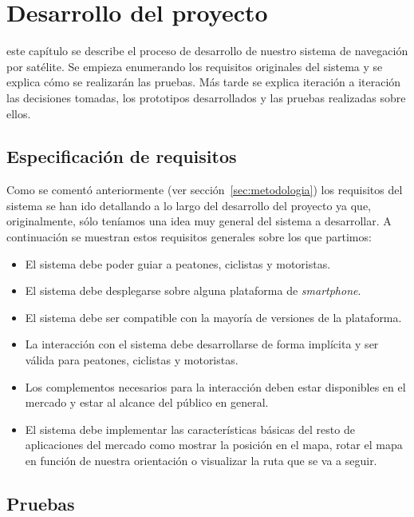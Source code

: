 \chapter{Desarrollo del proyecto}
\label{chap:desarrollo}

 este capítulo se describe el proceso de desarrollo de nuestro sistema de navegación por
satélite. Se empieza enumerando los requisitos originales del sistema y se explica cómo se
realizarán las pruebas. Más tarde se explica iteración a iteración las decisiones tomadas, los
prototipos desarrollados y las pruebas realizadas sobre ellos.

\section{Especificación de requisitos}
\label{sec:requisitos}

Como se comentó anteriormente (ver sección~\ref{sec:metodologia}) los requisitos del sistema se
han ido detallando a lo largo del desarrollo del proyecto ya que, originalmente, sólo teníamos una
idea muy general del sistema a desarrollar. A continuación se muestran estos requisitos generales
sobre los que partimos:

\begin{itemize}
  \item El sistema debe poder guiar a peatones, ciclistas y motoristas.
  \item El sistema debe desplegarse sobre alguna plataforma de \emph{smartphone}.
  \item El sistema debe ser compatible con la mayoría de versiones de la plataforma.
  \item La interacción con el sistema debe desarrollarse de forma implícita y ser válida para
    peatones, ciclistas y motoristas.
  \item Los complementos necesarios para la interacción deben estar disponibles en el
    mercado y estar al alcance del público en general.
  \item El sistema debe implementar las características básicas del resto de aplicaciones del
    mercado como mostrar la posición en el mapa, rotar el mapa en función de nuestra orientación o
    visualizar la ruta que se va a seguir.
\end{itemize}

\section{Pruebas}

